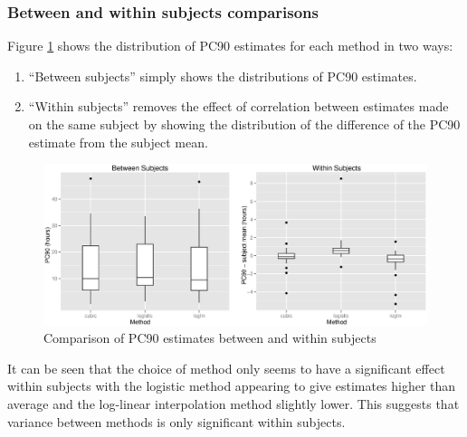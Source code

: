 \subsubsection*{Between and within subjects comparisons}
Figure \ref{methodsbysubject} shows the distribution of PC90 estimates for each method in two ways:
\begin{enumerate}
\item ``Between subjects'' simply shows the distributions of PC90 estimates.
\item ``Within subjects'' removes the effect of correlation between estimates made on the same subject by showing the distribution of the difference of the PC90 estimate from the subject mean.
\end{enumerate}
\begin{figure}[p]
\includegraphics[width=150mm]{methodsbysubject.eps} 
\caption{Comparison of PC90 estimates between and within subjects}
\label{methodsbysubject}
\end{figure}
It can be seen that the choice of method only seems to have a significant effect within subjects with the logistic method appearing to give estimates higher than average and the log-linear interpolation method slightly lower. This suggests that variance between methods is only significant within subjects.
